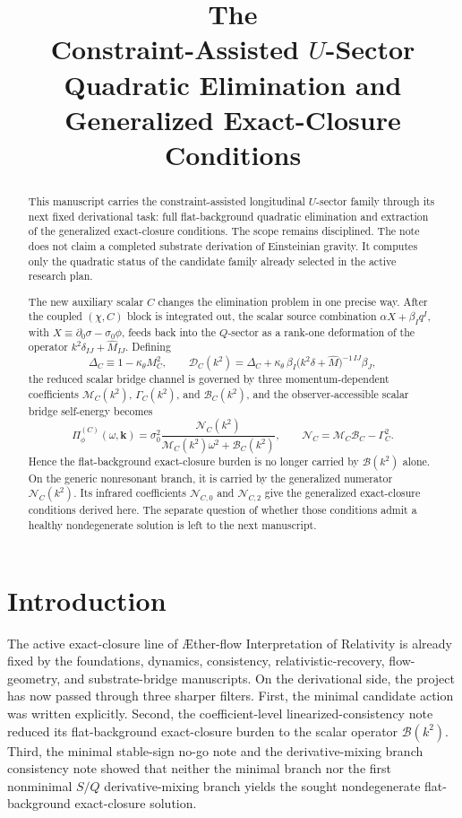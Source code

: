 \documentclass[11pt]{article}
\title{\textbf{The \TheoryName{}}\\[0.4em]
\large Constraint-Assisted \texorpdfstring{\(U\)}{U}-Sector Quadratic Elimination and Generalized Exact-Closure Conditions}
\author{}
\date{}
\newcommand{\Aflow}{\AE{}ther-flow}
\newcommand{\TheoryName}{\Aflow{} Interpretation of Relativity}
\begin{document}
\maketitle

\begin{abstract}
This manuscript carries the constraint-assisted longitudinal \(U\)-sector family through its next fixed derivational task: full flat-background quadratic elimination and extraction of the generalized exact-closure conditions. The scope remains disciplined. The note does not claim a completed substrate derivation of Einsteinian gravity. It computes only the quadratic status of the candidate family already selected in the active research plan.

The new auxiliary scalar \(C\) changes the elimination problem in one precise way. After the coupled \((\chi,C)\) block is integrated out, the scalar source combination \(\alpha X+\beta_I q^I\), with \(X\equiv \partial_0\sigma-\sigma_0\phi\), feeds back into the \(Q\)-sector as a rank-one deformation of the operator \(k^2\delta_{IJ}+\widehat M_{IJ}\). Defining
\[
\Delta_C\equiv 1-\kappa_\theta M_C^2,
\qquad
\mathcal D_C(k^2)
=
\Delta_C
+
\kappa_\theta\,\beta_I
\bigl(k^2\delta+\widehat M\bigr)^{-1\,IJ}
\beta_J,
\]
the reduced scalar bridge channel is governed by three momentum-dependent coefficients \(\mathcal M_C(k^2)\), \(\Gamma_C(k^2)\), and \(\mathcal B_C(k^2)\), and the observer-accessible scalar bridge self-energy becomes
\[
\Pi_\phi^{(C)}(\omega,\mathbf{k})
=
\sigma_0^2
\frac{\mathcal N_C(k^2)}
{\mathcal M_C(k^2)\omega^2+\mathcal B_C(k^2)},
\qquad
\mathcal N_C
=
\mathcal M_C\mathcal B_C-\Gamma_C^2.
\]
Hence the flat-background exact-closure burden is no longer carried by \(\mathcal B(k^2)\) alone. On the generic nonresonant branch, it is carried by the generalized numerator \(\mathcal N_C(k^2)\). Its infrared coefficients \(\mathcal N_{C,0}\) and \(\mathcal N_{C,2}\) give the generalized exact-closure conditions derived here. The separate question of whether those conditions admit a healthy nondegenerate solution is left to the next manuscript.
\end{abstract}

\section{Introduction}

The active exact-closure line of \TheoryName{} is already fixed by the foundations, dynamics, consistency, relativistic-recovery, flow-geometry, and substrate-bridge manuscripts. On the derivational side, the project has now passed through three sharper filters. First, the minimal candidate action was written explicitly. Second, the coefficient-level linearized-consistency note reduced its flat-background exact-closure burden to the scalar operator \(\mathcal B(k^2)\). Third, the minimal stable-sign no-go note and the derivative-mixing branch consistency note showed that neither the minimal branch nor the first nonminimal \(S/Q\) derivative-mixing branch yields the sought nondegenerate flat-background exact-closure solution.
\end{document}
